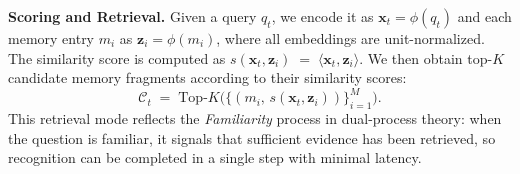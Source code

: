 




\textbf{Scoring and Retrieval.}
\label{sec:RR}
Given a query $q_t$, we encode it as $\mathbf{x}_t=\phi(q_t)$ and each memory entry $m_i$ as $\mathbf{z}_i=\phi(m_i)$, where all embeddings are unit-normalized. The similarity score is computed as $
s(\mathbf{x}_t,\mathbf{z}_i) \;=\; \langle \mathbf{x}_t,\mathbf{z}_i\rangle $.
We then obtain top-$K$ candidate memory fragments according to their similarity scores:
\begin{equation}
\mathcal{C}_t \;=\; \text{Top-}K\Big(\{(m_i,\,s(\mathbf{x}_t,\mathbf{z}_i))\}_{i=1}^{M}\Big).
\end{equation}
This retrieval mode reflects the \emph{Familiarity} process in dual-process theory: when the question is familiar, it signals that sufficient evidence has been retrieved, so recognition can be completed in a single step with minimal latency.

